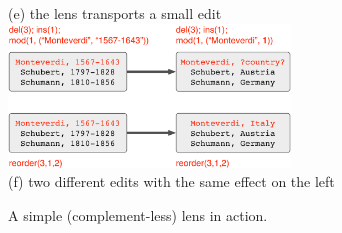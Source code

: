 \begin{figure}
\begin{center}
        (e) the lens transports a small edit \\[1.5ex]
        \includegraphics[width=75mm]{images/ex1-5.pdf} \\
        (f) two different edits with the same effect on the left
    \end{center}
\iflater
{}
\fi
    \caption{A simple (complement-less) {\edit} lens in action.}
    \ifdissertation\draftspaced\fi
    \label{fig:example-simple}
\end{figure}

